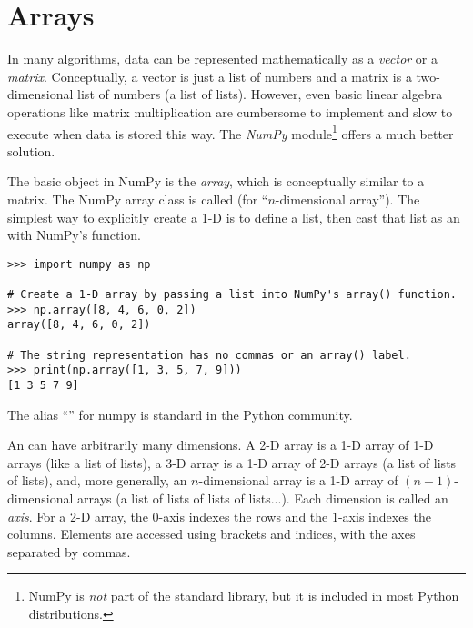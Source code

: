 
\label{lab:NumPy}

\section*{Arrays} %

In many algorithms, data can be represented mathematically as a \emph{vector} or a \emph{matrix}.
Conceptually, a vector is just a list of numbers and a matrix is a two-dimensional list of numbers (a list of lists).
However, even basic linear algebra operations like matrix multiplication are cumbersome to implement and slow to execute when data is stored this way.
The \emph{NumPy} module\footnote{NumPy is \emph{not} part of the standard library, but it is included in most Python distributions.} \cite{oliphant2006guide,ascher2001numerical,oliphant2007python} offers a much better solution.

The basic object in NumPy is the \emph{array}, which is conceptually similar to a matrix.
The NumPy array class is called  (for ``$n$-dimensional array'').
The simplest way to explicitly create a 1-D  is to define a list, then cast that list as an  with NumPy's  function.

\begin{lstlisting}
>>> import numpy as np

# Create a 1-D array by passing a list into NumPy's array() function.
>>> np.array([8, 4, 6, 0, 2])
array([8, 4, 6, 0, 2])

# The string representation has no commas or an array() label.
>>> print(np.array([1, 3, 5, 7, 9]))
[1 3 5 7 9]
\end{lstlisting}
%
The alias ``'' for numpy is standard in the Python community. %

An  can have arbitrarily many dimensions.
A 2-D array is a 1-D array of 1-D arrays (like a list of lists), a 3-D array is a 1-D array of 2-D arrays (a list of lists of lists), and, more generally, an $n$-dimensional array is a 1-D array of $(n-1)$-dimensional arrays (a list of lists of lists of lists...).
Each dimension is called an \emph{axis}.
For a 2-D array, the $0$-axis indexes the rows and the $1$-axis indexes the columns.
Elements are accessed using brackets and indices, with the axes separated by commas.

